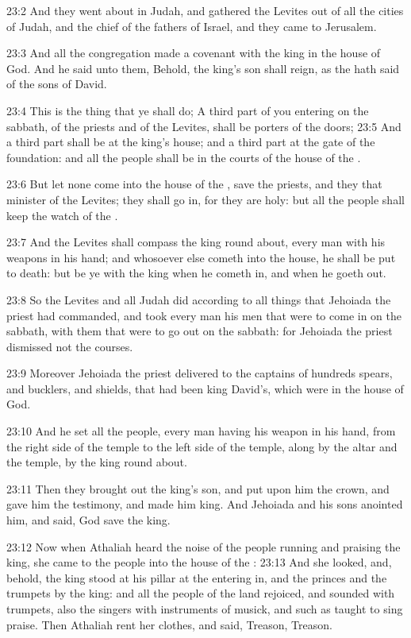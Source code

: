 23:2 And they went about in Judah, and gathered the Levites out of all
the cities of Judah, and the chief of the fathers of Israel, and they
came to Jerusalem.

23:3 And all the congregation made a covenant with the king in the
house of God. And he said unto them, Behold, the king's son shall
reign, as the \LORD hath said of the sons of David.

23:4 This is the thing that ye shall do; A third part of you entering
on the sabbath, of the priests and of the Levites, shall be porters of
the doors; 23:5 And a third part shall be at the king's house; and a
third part at the gate of the foundation: and all the people shall be
in the courts of the house of the \LORD.

23:6 But let none come into the house of the \LORD, save the priests,
and they that minister of the Levites; they shall go in, for they are
holy: but all the people shall keep the watch of the \LORD.

23:7 And the Levites shall compass the king round about, every man
with his weapons in his hand; and whosoever else cometh into the
house, he shall be put to death: but be ye with the king when he
cometh in, and when he goeth out.

23:8 So the Levites and all Judah did according to all things that
Jehoiada the priest had commanded, and took every man his men that
were to come in on the sabbath, with them that were to go out on the
sabbath: for Jehoiada the priest dismissed not the courses.

23:9 Moreover Jehoiada the priest delivered to the captains of
hundreds spears, and bucklers, and shields, that had been king
David's, which were in the house of God.

23:10 And he set all the people, every man having his weapon in his
hand, from the right side of the temple to the left side of the
temple, along by the altar and the temple, by the king round about.

23:11 Then they brought out the king's son, and put upon him the
crown, and gave him the testimony, and made him king. And Jehoiada and
his sons anointed him, and said, God save the king.

23:12 Now when Athaliah heard the noise of the people running and
praising the king, she came to the people into the house of the \LORD:
23:13 And she looked, and, behold, the king stood at his pillar at the
entering in, and the princes and the trumpets by the king: and all the
people of the land rejoiced, and sounded with trumpets, also the
singers with instruments of musick, and such as taught to sing praise.
Then Athaliah rent her clothes, and said, Treason, Treason.

